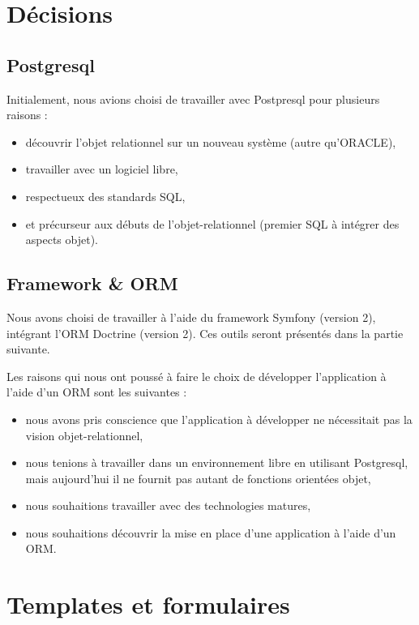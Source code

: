 \section{Décisions}

\subsection{Postgresql}

Initialement, nous avions choisi de travailler avec Postpresql pour plusieurs raisons :
\begin{itemize}
\item découvrir l'objet relationnel sur un nouveau système (autre qu'ORACLE),
\item travailler avec un logiciel libre,
\item respectueux des standards SQL,
\item et précurseur aux débuts de l'objet-relationnel (premier SQL à intégrer des aspects objet).
\end{itemize}

\subsection{Framework \& ORM}

Nous avons choisi de travailler à l'aide du framework Symfony (version 2), intégrant l'ORM Doctrine (version 2). Ces outils seront présentés dans la partie suivante.

Les raisons qui nous ont poussé à faire le choix de développer l'application à l'aide d'un ORM sont les suivantes :
\begin{itemize}
\item nous avons pris conscience que l'application à développer ne nécessitait pas la vision objet-relationnel,
\item nous tenions à travailler dans un environnement libre en utilisant Postgresql, mais aujourd'hui il ne fournit pas autant de fonctions orientées objet,
\item nous souhaitions travailler avec des technologies matures,
\item nous souhaitions découvrir la mise en place d'une application à l'aide d'un ORM.
\end{itemize}
	
	
\section{Templates et formulaires}

